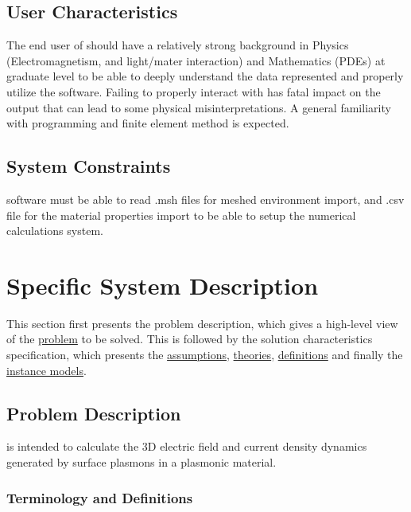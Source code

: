 \documentclass[12pt]{article}
\begin{document}
\subsection{User Characteristics} \label{SecUserCharacteristics}
The end user of \progname{} should have a relatively strong background in  Physics (Electromagnetism, and light/mater interaction) and Mathematics (PDEs) at graduate level to be able to deeply understand the data represented and properly utilize the software. Failing to properly interact with \progname{} has fatal impact on the output that can lead to some physical misinterpretations. A general familiarity with programming and finite element method is expected.  




\subsection{System Constraints}
\progname software must be able to read .msh files for meshed environment import, and .csv file for the material properties import to be able to setup the numerical calculations system.

\section{Specific System Description}

This section first presents the problem description, which gives a high-level
view of the \hyperref[Sec_pd]{problem} to be solved. This is followed by the solution characteristics
specification, which presents the \hyperref[sec_assumpt]{assumptions}, \hyperref[sec_theoretical]{theories}, \hyperref[sec_datadef]{definitions} and finally
the \hyperref[sec_instance]{instance models}.  

\subsection{Problem Description} \label{Sec_pd}

\progname{} is intended to calculate the 3D electric field and current density dynamics generated by surface plasmons in a plasmonic material. 

\subsubsection{Terminology and  Definitions}

\end{document}
